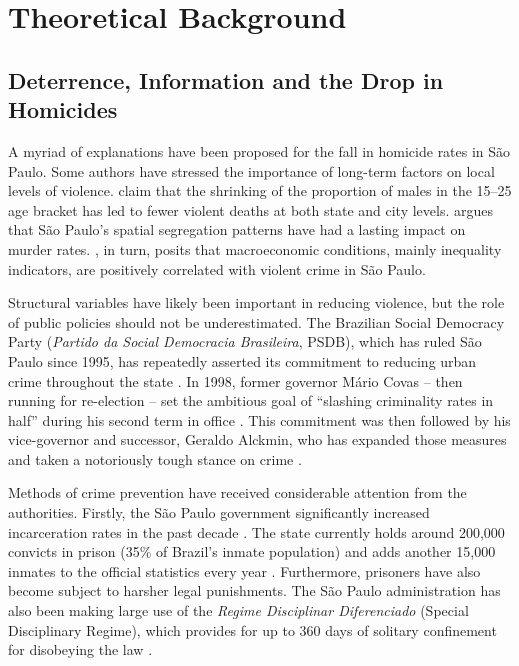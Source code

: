 \section{Theoretical Background}
\label{sec:theoretical_background}

\subsection{Deterrence, Information and the Drop in Homicides}
\label{sub:deterrence_and_the_drop_in_homicides}

A myriad of explanations have been proposed for the fall in homicide rates in São Paulo. Some authors have stressed the importance of long-term factors on local levels of violence. \citet{mello2010} claim that the shrinking of the proportion of males in the 15--25 age bracket has led to fewer violent deaths at both state and city levels. \citet{hughes2004} argues that São Paulo's spatial segregation patterns have had a lasting impact on murder rates. \citet{barata2000}, in turn, posits that macroeconomic conditions, mainly inequality indicators, are positively correlated with violent crime in São Paulo.

Structural variables have likely been important in reducing violence, but the role of public policies should not be underestimated. The Brazilian Social Democracy Party (\emph{Partido da Social Democracia Brasileira}, PSDB), which has ruled São Paulo since 1995, has repeatedly asserted its commitment to reducing urban crime throughout the state \citep{bueno2014}. In 1998, former governor Mário Covas -- then running for re-election -- set the ambitious goal of ``slashing criminality rates in half'' during his second term in office \citep{santos2008}. This commitment was then followed by his vice-governor and successor, Geraldo Alckmin, who has expanded those measures and taken a notoriously tough stance on crime \citep{de2012governo}. 

Methods of crime prevention have received considerable attention from the authorities. Firstly, the São Paulo government significantly increased incarceration rates in the past decade \citep{salla2007}. The state currently holds around 200,000 convicts in prison (35\% of Brazil's inmate population) and adds another 15,000 inmates to the official statistics every year \citep{brasildefato2013}. Furthermore, prisoners have also become subject to harsher legal punishments. The São Paulo administration has also been making large use of the \emph{Regime Disciplinar Diferenciado} (Special Disciplinary Regime), which provides for up to 360 days of solitary confinement for disobeying the law \citep{carvalho2005}.

